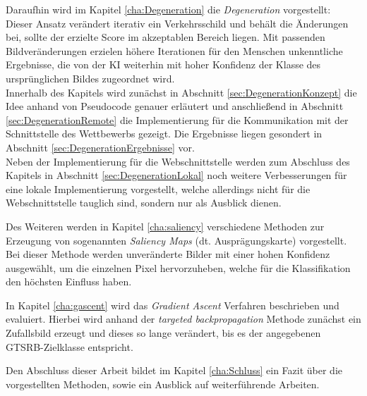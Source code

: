 Daraufhin wird im Kapitel \ref{cha:Degeneration} die \textit{Degeneration} vorgestellt:\\
Dieser Ansatz verändert iterativ ein Verkehrsschild und behält die Änderungen bei, sollte der erzielte Score im akzeptablen Bereich liegen. 
Mit passenden Bildveränderungen erzielen höhere Iterationen für den Menschen unkenntliche Ergebnisse, die von der \ac{KI} weiterhin mit hoher Konfidenz der Klasse des ursprünglichen Bildes zugeordnet wird.\\
Innerhalb des Kapitels wird zunächst in Abschnitt \ref{sec:DegenerationKonzept} die Idee anhand von Pseudocode genauer erläutert und anschließend in Abschnitt \ref{sec:DegenerationRemote} die Implementierung für die Kommunikation mit der Schnittstelle des Wettbewerbs gezeigt. 
Die Ergebnisse liegen gesondert in Abschnitt \ref{sec:DegenerationErgebnisse} vor. \\
Neben der Implementierung für die Webschnittstelle werden zum Abschluss des Kapitels in Abschnitt \ref{sec:DegenerationLokal} noch weitere Verbesserungen für eine lokale Implementierung vorgestellt, welche allerdings nicht für die Webschnittstelle tauglich sind, sondern nur als Ausblick dienen.


Des Weiteren werden in Kapitel \ref{cha:saliency} verschiedene Methoden zur Erzeugung von sogenannten \textit{Saliency Maps} (dt. Ausprägungskarte) vorgestellt. 
Bei dieser Methode werden unveränderte Bilder mit einer hohen Konfidenz ausgewählt, um die einzelnen Pixel hervorzuheben, welche für die Klassifikation den höchsten Einfluss haben.

In Kapitel \ref{cha:gascent} wird das \textit{Gradient Ascent} Verfahren beschrieben und evaluiert. 
Hierbei wird anhand der \textit{targeted backpropagation} Methode zunächst ein Zufallsbild erzeugt und dieses so lange verändert, bis es der angegebenen \ac{GTSRB}-Zielklasse entspricht.

Den Abschluss dieser Arbeit bildet im Kapitel \ref{cha:Schluss} ein Fazit über die vorgestellten Methoden, sowie ein Ausblick auf weiterführende Arbeiten. 
